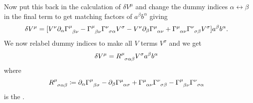 \documentclass[fleqn]{NotesClass}
\newcommand*{\christoffel}[3]{\tensor{\Gamma}{^{#1}_{{#2}{#3}}}}
\begin{document}
    Now put this back in the calculation of \(\delta V^\mu\) and change the dummy indices \(\alpha \leftrightarrow \beta\) in the final term to get matching factors of \(a^\beta b^\alpha\) giving
    \begin{equation}
        \delta V^\mu = [V^\nu\partial_\alpha \christoffel{\mu}{\beta}{\nu} - \christoffel{\mu}{\beta}{\nu} \christoffel{\nu}{\sigma}{\alpha} V^\sigma - V^\nu\partial_\beta \christoffel{\mu}{\alpha}{\nu} + \christoffel{\mu}{\alpha}{\nu} \christoffel{\nu}{\sigma}{\beta} V^\sigma] a^\beta b^\alpha.
    \end{equation}
    We now relabel dummy indices to make all \(V\) terms \(V^\sigma\) and we get
    \begin{equation}
        \delta V^\mu = \tensor{R}{^\mu_{\sigma\alpha\beta}} V^\sigma a^\beta b^\alpha
    \end{equation}
    where
    \begin{equation}
        \tensor{R}{^\mu_{\sigma\alpha\beta}} \coloneqq \partial_\alpha \christoffel{\mu}{\beta}{\sigma} - \partial_\beta \christoffel{\mu}{\alpha}{\sigma} + \christoffel{\mu}{\alpha}{\nu} \christoffel{\nu}{\sigma}{\beta} - \christoffel{\mu}{\beta}{\nu} \christoffel{\nu}{\sigma}{\alpha}
    \end{equation}
    is the .
    
\end{document}
